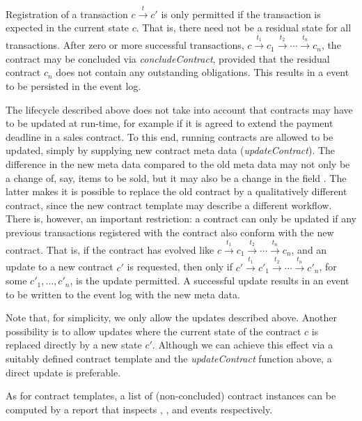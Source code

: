 Registration of a transaction $c \stackrel{t}{\to} c'$ is only
permitted if the transaction is expected in the current state
$c$. That is, there need not be a residual state for all
transactions. After zero or more successful transactions, $c
\stackrel{t_1}{\to} c_1 \stackrel{t_2}{\to} \cdots \stackrel{t_n}{\to}
c_n$, the contract may be concluded via \emph{concludeContract},
provided that the residual contract $c_n$ does not contain any
outstanding obligations. This results in a
 event to be persisted in the event log.

The lifecycle described above does not take into account that
contracts may have to be updated at run-time, for example if it is
agreed to extend the payment deadline in a sales contract. To this
end, running contracts are allowed to be updated, simply by supplying
new contract meta data (\emph{updateContract}). The difference in the
new meta data compared to the old meta data may not only be a change
of, say, items to be sold, but it may also be a change in the field
. The latter makes it is possible to
replace the old contract by a qualitatively different contract, since
the new contract template may describe a different workflow. There is,
however, an important restriction: a contract can only be updated if
any previous transactions registered with the contract also conform
with the new contract. That is, if the contract has evolved like $c
\stackrel{t_1}{\to} c_1 \stackrel{t_2}{\to} \cdots \stackrel{t_n}{\to}
c_n$, and an update to a new contract $c'$ is requested, then only if
$c' \stackrel{t_1}{\to} c'_1 \stackrel{t_2}{\to} \cdots
\stackrel{t_n}{\to} c'_n$, for some $c'_1,\ldots,c'_n$, is the update
permitted. A successful update results in an
 event to be written to the event log with
the new meta data.

Note that, for simplicity, we only allow the updates described above.
Another possibility is to allow updates where the current state of the
contract $c$ is replaced directly by a new state $c'$. Although we can
achieve this effect via a suitably defined contract template and the
\emph{updateContract} function above, a direct update is preferable.

As for contract templates, a list of (non-concluded) contract
instances can be computed by a report that inspects
, , and
 events respectively.

